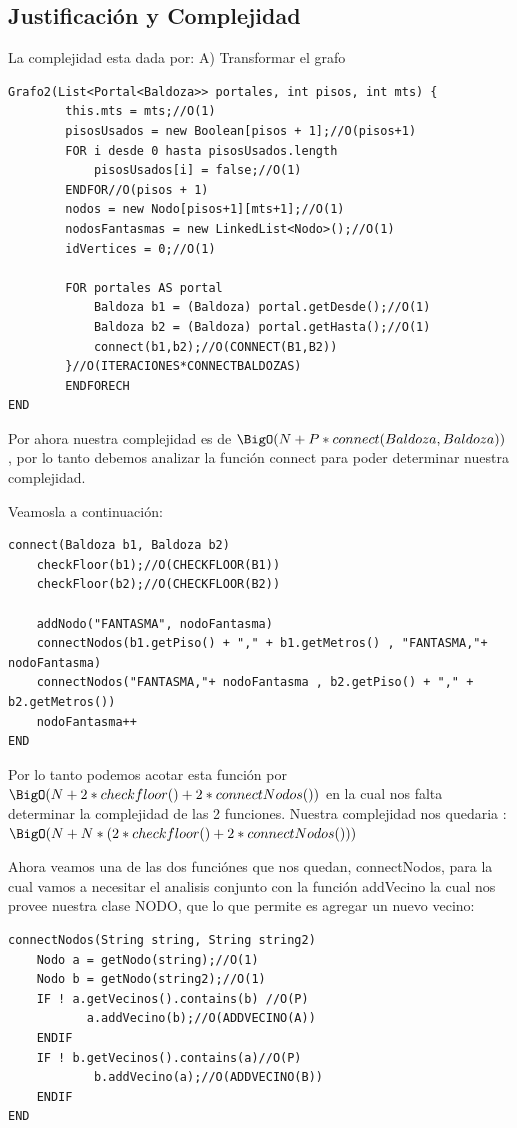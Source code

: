 \subsection{Justificaci\'on y Complejidad}
La complejidad esta dada por: \endl
A) Transformar el grafo\endl
\begin{lstlisting}
Grafo2(List<Portal<Baldoza>> portales, int pisos, int mts) {
		this.mts = mts;//O(1)
		pisosUsados = new Boolean[pisos + 1];//O(pisos+1)
		FOR i desde 0 hasta pisosUsados.length
			pisosUsados[i] = false;//O(1)
		ENDFOR//O(pisos + 1)
		nodos = new Nodo[pisos+1][mts+1];//O(1)
		nodosFantasmas = new LinkedList<Nodo>();//O(1)
		idVertices = 0;//O(1)
	
		FOR portales AS portal
			Baldoza b1 = (Baldoza) portal.getDesde();//O(1)
			Baldoza b2 = (Baldoza) portal.getHasta();//O(1)
			connect(b1,b2);//O(CONNECT(B1,B2))
		}//O(ITERACIONES*CONNECTBALDOZAS)
		ENDFORECH
END
\end{lstlisting}


Por ahora nuestra complejidad es de $\BigO(N + P * connect(Baldoza, Baldoza))$ , por lo tanto debemos analizar la funci\'on connect para poder determinar nuestra complejidad.

Veamosla a continuaci\'on:

\begin{lstlisting}	
connect(Baldoza b1, Baldoza b2) 
	checkFloor(b1);//O(CHECKFLOOR(B1))
	checkFloor(b2);//O(CHECKFLOOR(B2))

	addNodo("FANTASMA", nodoFantasma) 
	connectNodos(b1.getPiso() + "," + b1.getMetros() , "FANTASMA,"+ nodoFantasma)
	connectNodos("FANTASMA,"+ nodoFantasma , b2.getPiso() + "," + b2.getMetros())
	nodoFantasma++	
END
\end{lstlisting}

Por lo tanto podemos acotar esta funci\'on por $\BigO(N + 2 * checkfloor() + 2 * connectNodos())$ en la cual nos falta determinar la complejidad de las 2 funciones.
Nuestra complejidad nos quedaria : $\BigO(N + N * (2 * checkfloor() + 2 * connectNodos()))$

Ahora veamos una de las dos funci\'ones que nos quedan, connectNodos, para la cual vamos a necesitar el analisis conjunto con la funci\'on addVecino la cual nos provee nuestra clase NODO, que lo que permite es agregar un nuevo vecino:

\pagebreak

\begin{lstlisting}
connectNodos(String string, String string2)
	Nodo a = getNodo(string);//O(1)
	Nodo b = getNodo(string2);//O(1)
	IF ! a.getVecinos().contains(b) //O(P)
           a.addVecino(b);//O(ADDVECINO(A))
	ENDIF
	IF ! b.getVecinos().contains(a)//O(P)
            b.addVecino(a);//O(ADDVECINO(B))
	ENDIF
END
\end{lstlisting}

